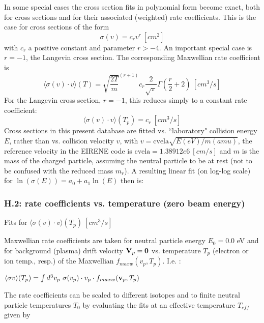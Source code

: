 \documentclass[12pt,dvipdfmx]{article}
\begin{document}
In some special cases the cross section fits in polynomial form become exact, both for cross sections and
for their associated (weighted) rate coefficients.
This is the case for cross sections of the form
\begin{equation}
\sigma(v) = c_r v^r  \ [cm^2]
\end{equation}
with $c_r$ a positive constant and parameter $r>-4$. An important special case is $r=-1$, the Langevin cross section.
The corresponding Maxwellian rate coefficient is
\begin{equation}
\langle\sigma(v) \cdot v  \rangle (T) = \sqrt{\frac {2T}{m}}^{(r+1)} c_r \frac{2}{\sqrt{\pi}}
\Gamma(\frac{r}{2}+2) \ [cm^3/s]
\end{equation}
For the Langevin cross section, $r=-1$, this reduces simply to a constant rate coefficient:
\begin{equation}
\langle\sigma(v) \cdot v  \rangle (T_p) =  c_r  \ [cm^3/s]
\end{equation}
Cross sections in this present database are fitted vs. ``laboratory" collision energy $E$, rather than vs. collision velocity $v$, with $v=\mbox{cvela} \sqrt{E(eV)/m(amu)}$, the reference velocity
in the EIRENE code is $\mbox{cvela} = 1.38912 e6 \ [cm/s]$ and $m$ is the mass of the charged particle, assuming the neutral particle to be at rest (not to be confused with the reduced mass $m_r$). A resulting linear fit (on log-log scale) for
$\ln(\sigma(E)) = a_0 + a_1 \ln(E) $ then is:

\subsubsection{H.2: rate coefficients vs. temperature (zero beam energy)}\label{sec1.3.2}
Fits for $\langle\sigma(v) \cdot v  \rangle (T_p) \ [cm^3/s]$

Maxwellian rate coefficients are taken for neutral particle energy $E_0 = 0.0$ eV and for background (plasma) drift velocity ${\bf V}_p ={\bf 0}$
vs. temperature $T_p$ (electron or ion temp., resp.) of the Maxwellian $f_{maxw}(v_p,T_p)$.
I.e. :

$\langle\sigma v \rangle(T_p) = \int d^3v_p \ \sigma(v_{p}) \cdot v_{p} \cdot
f_{maxw}({\bf v}_{p},T_p)$

The  rate coefficients can be scaled to different isotopes and to finite
neutral particle temperatures $T_0$ by evaluating the fits at an
effective temperature $T_{eff}$ given by
\end{document}
